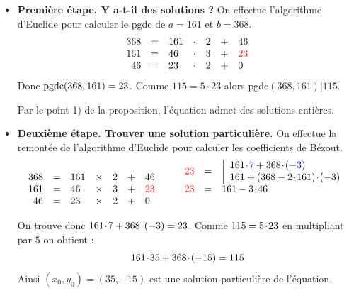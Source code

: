 \begin{itemize}
 \item  \textbf{Première étape. Y a-t-il des solutions ?}
On effectue l'algorithme d'Euclide pour calculer le pgdc de $a=161$ et $b=368$.
$$
\begin{array}{rclclcl}
368 & = & 161 & \cdot & 2 & + & 46 \\
161 & = & 46 & \cdot & 3 & + & \textcolor{red}{23} \\
46  & = & 23   & \cdot & 2 & + & 0 \\
\end{array}
$$
Donc $\textrm{pgdc}(368,161)=23$.
Comme $115=5\cdot 23$ alors pgdc$(368,161) | 115$.

\smallskip
Par le point 1) de la proposition, l'équation admet des solutions entières.

 \item  \textbf{Deuxième étape. Trouver une solution particulière.}
On effectue la remontée de l'algorithme d'Euclide pour calculer les coefficients de Bézout.
$$
\begin{array}{rclclcl}
&&&&&&\\
368 & = & 161 & \times & 2 & + & 46 \\
161 & = & 46 & \times & 3 & + & \textcolor{red}{23} \\
46  & = & 23   & \times & 2 & + & 0 \\
\end{array}
\qquad
\begin{array}{rcl}
\textcolor{red}{23} &=&
\left|\begin{array}{l}
161 \hspace*{-0.5mm}\cdot\hspace*{-0.5mm} \textcolor{blue}{7} + 368 \hspace*{-0.5mm}\cdot\hspace*{-0.5mm} (\textcolor{blue}{-3})\\
161 + (368-2\hspace*{-0.5mm}\cdot\hspace*{-0.5mm} 161)\hspace*{-0.5mm}\cdot\hspace*{-0.5mm} (-3)\\
\end{array}\right.\\
\textcolor{red}{23} &=& 161 -3 \hspace*{-0.5mm}\cdot\hspace*{-0.5mm} 46  \\
&& \\
\end{array}
$$

On trouve donc $161\hspace*{-0.5mm}\cdot\hspace*{-0.5mm}7 + 368\hspace*{-0.5mm}\cdot\hspace*{-0.5mm}(-3)=23$.
Comme $115=5\hspace*{-0.5mm}\cdot\hspace*{-0.5mm}23$ en multipliant par $5$ on obtient :
$$161\hspace*{-0.5mm}\cdot\hspace*{-0.5mm}35 + 368\hspace*{-0.5mm}\cdot\hspace*{-0.5mm}(-15)=115$$
Ainsi $(x_0,y_0) = (35,-15)$ est une solution particulière de l'équation.


\end{itemize}
